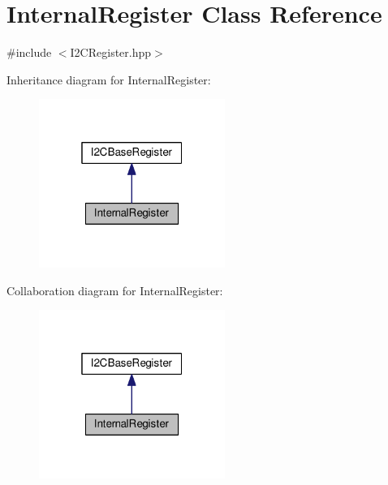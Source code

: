 \hypertarget{class_internal_register}{}\section{Internal\+Register Class Reference}
\label{class_internal_register}


{\ttfamily \#include $<$I2\+C\+Register.\+hpp$>$}



Inheritance diagram for Internal\+Register\+:\nopagebreak
\begin{figure}[H]
\begin{center}
\leavevmode
\includegraphics[width=172pt]{class_internal_register__inherit__graph}
\end{center}
\end{figure}


Collaboration diagram for Internal\+Register\+:\nopagebreak
\begin{figure}[H]
\begin{center}
\leavevmode
\includegraphics[width=172pt]{class_internal_register__coll__graph}
\end{center}
\end{figure}
